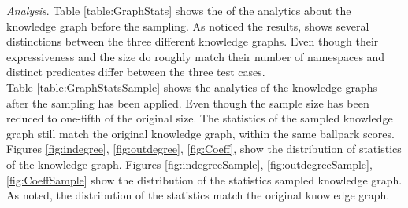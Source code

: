 \documentclass{article}
\begin{document}
\textit{Analysis}. Table \ref{table:GraphStats} shows the of the analytics about the knowledge graph before the sampling. As noticed the results, shows several distinctions between the three different knowledge graphs. Even though their expressiveness and the size do roughly match their number of namespaces and distinct predicates 
differ between the three test cases.\\
Table \ref{table:GraphStatsSample} shows the analytics of the knowledge graphs after the sampling has been applied. Even though the sample size has been reduced to one-fifth of the original size. The statistics of the sampled knowledge graph still match the original knowledge graph, within the same ballpark scores.
Figures \ref{fig:indegree},  \ref{fig:outdegree},  \ref{fig:Coeff}, show the distribution of statistics of the knowledge graph. %
Figures \ref{fig:indegreeSample},  \ref{fig:outdegreeSample},  \ref{fig:CoeffSample} show the distribution of the statistics sampled knowledge graph. As noted, the distribution
of the statistics match the original knowledge graph. \\

\begin{table}[!t]
	\centering
	\caption{table showing several statistics about graphs.}
	\label{table:GraphStatsSample}
\end{table}
\end{document}
